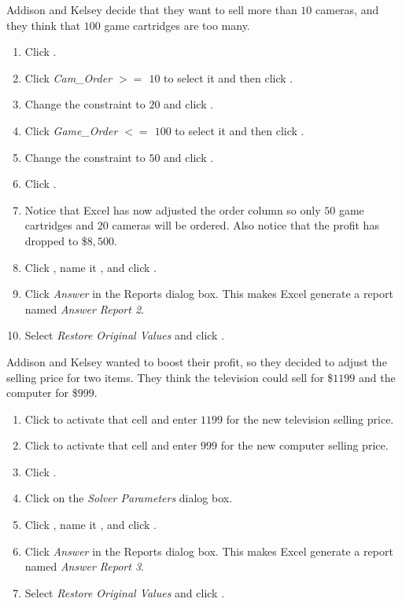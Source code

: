 Addison and Kelsey decide that they want to sell more than $ 10 $ cameras, and they think that $ 100 $ game cartridges are too many. 

\begin{enumbox}
	\begin{enumerate}
		\item Click .
		\item Click \textit{Cam\_Order $ >=$ $ 10 $} to select it and then click .
		\item Change the constraint to $ 20 $ and click .
		\item Click \textit{Game\_Order $ <=$ $ 100 $} to select it and then click .
		\item Change the constraint to $ 50 $ and click .
		\item Click .
		\item Notice that Excel has now adjusted the order column so only $ 50 $ game cartridges and $ 20 $ cameras will be ordered. Also notice that the profit has dropped to \$$ 8,500 $. 
		\item Click , name it , and click .
		\item Click \textit{Answer} in the Reports dialog box. This makes Excel generate a report named \textit{Answer Report 2}.
		\item Select \textit{Restore Original Values} and click .
	\end{enumerate}
\end{enumbox}

Addison and Kelsey wanted to boost their profit, so they decided to adjust the selling price for two items. They think the television could sell for \$$ 1199 $ and the computer for \$$ 999 $. 

\begin{enumbox}
	\begin{enumerate}
		\item Click  to activate that cell and enter $ 1199 $ for the new television selling price.
		\item Click  to activate that cell and enter $ 999 $ for the new computer selling price.
		\item Click .
		\item Click  on the \textit{Solver Parameters} dialog box.
		\item Click , name it , and click .
		\item Click \textit{Answer} in the Reports dialog box. This makes Excel generate a report named \textit{Answer Report 3}.
		\item Select \textit{Restore Original Values} and click .
	\end{enumerate}
\end{enumbox}
	
